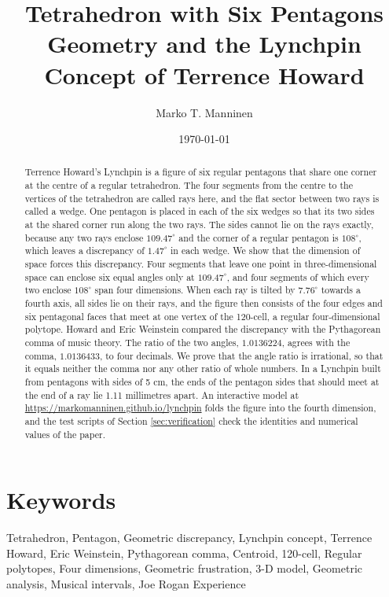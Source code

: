 \documentclass[a4paper,12pt]{article}
\title{Tetrahedron with Six Pentagons Geometry and the Lynchpin Concept of Terrence Howard}
\author{Marko T. Manninen}
\date{\today}
\begin{document}
\maketitle

\begin{abstract}
\noindent
Terrence Howard's Lynchpin is a figure of six regular pentagons that share one corner at the centre of a regular tetrahedron. The four segments from the centre to the vertices of the tetrahedron are called rays here, and the flat sector between two rays is called a wedge. One pentagon is placed in each of the six wedges so that its two sides at the shared corner run along the two rays. The sides cannot lie on the rays exactly, because any two rays enclose \( 109.47^\circ \) and the corner of a regular pentagon is \( 108^\circ \), which leaves a discrepancy of \( 1.47^\circ \) in each wedge. We show that the dimension of space forces this discrepancy. Four segments that leave one point in three-dimensional space can enclose six equal angles only at \( 109.47^\circ \), and four segments of which every two enclose \( 108^\circ \) span four dimensions. When each ray is tilted by \( 7.76^\circ \) towards a fourth axis, all sides lie on their rays, and the figure then consists of the four edges and six pentagonal faces that meet at one vertex of the 120-cell, a regular four-dimensional polytope. Howard and Eric Weinstein compared the discrepancy with the Pythagorean comma of music theory. The ratio of the two angles, \( 1.0136224 \), agrees with the comma, \( 1.0136433 \), to four decimals. We prove that the angle ratio is irrational, so that it equals neither the comma nor any other ratio of whole numbers. In a Lynchpin built from pentagons with sides of 5 cm, the ends of the pentagon sides that should meet at the end of a ray lie 1.11 millimetres apart. An interactive model at \url{https://markomanninen.github.io/lynchpin} folds the figure into the fourth dimension, and the test scripts of Section \ref{sec:verification} check the identities and numerical values of the paper.
\end{abstract}

\section*{Keywords}
Tetrahedron, Pentagon, Geometric discrepancy, Lynchpin concept, Terrence Howard, Eric Weinstein, Pythagorean comma, Centroid, 120-cell, Regular polytopes, Four dimensions, Geometric frustration, 3-D model, Geometric analysis, Musical intervals, Joe Rogan Experience
\end{document}
